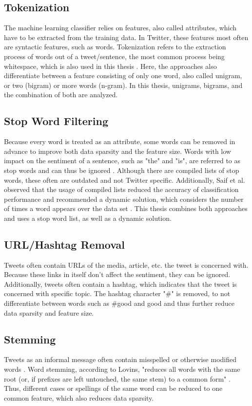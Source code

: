 \subsection{Tokenization}
The machine learning classifier relies on features, also called attributes, which have to be extracted from the training data. In Twitter, these features most often are syntactic features, such as words. Tokenization refers to the extraction process of words out of a tweet/sentence, the most common process being whitespace, which is also used in this thesis \cite{DBLP:journals/csur/GiachanouC16}.  Here, the approaches also differentiate between a feature consisting of only one word, also called unigram, or two (bigram) or more words (n-gram). In this thesis, unigrams, bigrams, and the combination of both are analyzed.

\subsection{Stop Word Filtering}
Because every word is treated as an attribute, some words can be removed in advance to improve both data sparsity and the feature size. Words with low impact on the sentiment of a sentence, such as "the" and "is", are referred to as stop words and can thus be ignored \cite{DBLP:journals/csur/GiachanouC16}. Although there are compiled lists of stop words, these often are outdated and not Twitter specific. Additionally, Saif et al. observed that the usage of compiled lists reduced the accuracy of classification performance and recommended a dynamic solution, which considers the number of times a word appears over the data set \cite{data_sparsity}. This thesis combines both approaches and uses a stop word list, as well as a dynamic solution.

\subsection{URL/Hashtag Removal}
Tweets often contain URLs of the media, article, etc. the tweet is concerned with. Because these links in itself don't affect the sentiment, they can be ignored. Additionally, tweets often contain a hashtag, which indicates that the tweet is concerned with specific topic. The hashtag character "\#" is removed, to not differentiate between words such as \#good and good and thus further reduce data sparsity and feature size.


\subsection{Stemming}
Tweets as an informal message often contain misspelled or otherwise modified words \cite{DBLP:journals/csur/GiachanouC16}. Word stemming, according to Lovins, "reduces all words with the same root (or, if prefixes are left
untouched, the same stem) to a common form" \cite[p.~22]{Lovins1968DevelopmentOA}. Thus, different cases or spellings of the same word can be reduced to one common feature, which also reduces data sparsity.

